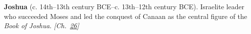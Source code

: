\textbf{Joshua} (c. 14th–13th century BCE–c. 13th–12th century BCE). Israelite leader who succeeded Moses and led the conquest of Canaan as the central figure of the \emph{Book of Joshua}. \emph{[Ch.~\hyperref[ch:jewishcalendar]{26}]}

